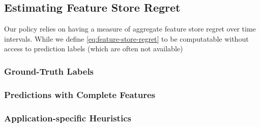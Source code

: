 





\subsection{Estimating Feature Store Regret}
Our policy relies on having a measure of aggregate feature store regret over time intervals. While we define \eqref{eq:feature-store-regret} to be computatable without access to prediction labels (which are often not available)

\subsubsection{Ground-Truth Labels}

\subsubsection{Predictions with Complete Features}

\subsubsection{Application-specific Heuristics}




